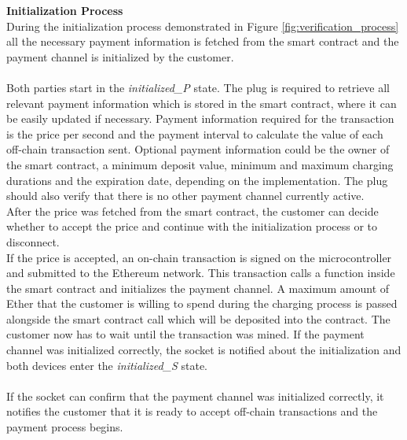 \textbf{Initialization Process}\\
During the initialization process demonstrated in Figure \ref{fig:verification_process} all the necessary payment information is fetched from the smart contract and the payment channel is initialized by the customer.
\\\\
Both parties start in the \textit{initialized\_P} state.
The plug is required to retrieve all relevant payment information which is stored in the smart contract, where it can be easily updated if necessary.
Payment information required for the transaction is the price per second and the payment interval to calculate the value of each off-chain transaction sent.
Optional payment information could be the owner of the smart contract, a minimum deposit value, minimum and maximum charging durations and the expiration date, depending on the implementation.
The plug should also verify that there is no other payment channel currently active.
\\
After the price was fetched from the smart contract, the customer can decide whether to accept the price and continue with the initialization process or to disconnect.
\\
If the price is accepted, an on-chain transaction is signed on the microcontroller and submitted to the Ethereum network.
This transaction calls a function inside the smart contract and initializes the payment channel.
A maximum amount of Ether that the customer is willing to spend during the charging process is passed alongside the smart contract call which will be deposited into the contract.
The customer now has to wait until the transaction was mined.
If the payment channel was initialized correctly, the socket is notified about the initialization and both devices enter the \textit{initialized\_S} state.
\\\\
If the socket can confirm that the payment channel was initialized correctly, it notifies the customer that it is ready to accept off-chain transactions and the payment process begins.

